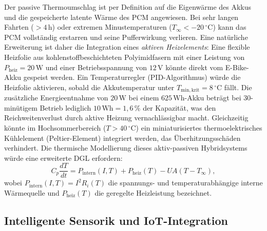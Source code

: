 ﻿\documentclass[a4paper,12pt]{article}
\theoremstyle{definition}
\begin{document}
Der passive Thermoumschlag ist per Definition auf die Eigenw\"arme des Akkus und die gespeicherte latente W\"arme des PCM angewiesen. Bei sehr langen Fahrten ($> 4\,\mathrm{h}$) oder extremen Minustemperaturen ($T_\infty < -20\,{}^\circ\mathrm{C}$) kann das PCM vollst\"andig erstarren und seine Pufferwirkung verlieren. Eine nat\"urliche Erweiterung ist daher die Integration eines \emph{aktiven Heizelements}: Eine flexible Heizfolie aus kohlenstoffbeschichteten Polyimidfasern mit einer Leistung von $P_\mathrm{heiz} = 20\,\mathrm{W}$ und einer Betriebsspannung von $12\,\mathrm{V}$ k\"onnte direkt vom E-Bike-Akku gespeist werden. Ein Temperaturregler (PID-Algorithmus) w\"urde die Heizfolie aktivieren, sobald die Akkutemperatur unter $T_\mathrm{min,krit} = 8\,{}^\circ\mathrm{C}$ f\"allt. Die zus\"atzliche Energieentnahme von $20\,\mathrm{W}$ bei einem $625\,\mathrm{Wh}$-Akku betr\"agt bei 30-min\"utigem Betrieb lediglich $10\,\mathrm{Wh} = 1{,}6\,\%$ der Kapazit\"at, was den Reichweitenverlust durch aktive Heizung vernachl\"assigbar macht. Gleichzeitig k\"onnte im Hochsommerbereich ($T > 40\,{}^\circ\mathrm{C}$) ein miniaturisiertes thermoelektrisches K\"uhlelement (Peltier-Element) integriert werden, das \"Uberhitzungssch\"aden verhindert. Die thermische Modellierung dieses aktiv-passiven Hybridsystems w\"urde eine erweiterte DGL erfordern:
\[
  C_p \frac{dT}{dt} = P_\mathrm{intern}(I,T) + P_\mathrm{heiz}(T) - UA(T - T_\infty),
\]
wobei $P_\mathrm{intern}(I,T) = I^2 R_i(T)$ die spannungs- und temperaturabh\"angige interne W\"arme\-quelle und $P_\mathrm{heiz}(T)$ die geregelte Heizleistung bezeichnet.

\subsection{Intelligente Sensorik und IoT-Integration}
\end{document}

